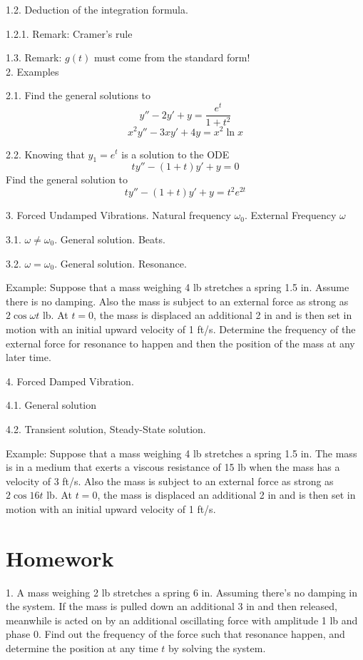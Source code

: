 \documentclass[11pt]{article}
\begin{document}
1.2. Deduction of the integration formula.

1.2.1. Remark: Cramer's rule

1.3. Remark: $g(t)$ must come from the standard form! \\

2. Examples

2.1. Find the general solutions to 
$$y'' - 2y' + y = \frac{e^t}{1+t^2}$$
$$x^2 y'' - 3x y' + 4y = x^2 \ln x$$

2.2. Knowing that $y_1 = e^t$ is a solution to the ODE
$$ty'' - (1+t)y' + y = 0$$
Find the general solution to
$$ty'' - (1+t)y' + y = t^2 e^{2t}$$
 

3. Forced Undamped Vibrations. Natural frequency $\omega_0$. External Frequency $\omega$

3.1. $\omega \neq \omega_0$. General solution. Beats. 

3.2. $\omega = \omega_0$. General solution. Resonance. 

Example: Suppose that a mass weighing 4 lb stretches a spring 1.5 in. Assume there is no damping. Also the mass is subject to an external force as strong as $2\cos \omega t$ lb. At $t=0$, the mass is displaced an additional 2 in and is then set in motion with an initial upward velocity of 1 ft/s. Determine the frequency of the external force for resonance to happen and then the position of the mass at any later time. 

4. Forced Damped Vibration.

4.1. General solution

4.2. Transient solution, Steady-State solution.

Example: Suppose that a mass weighing 4 lb stretches a spring 1.5 in. The mass is in a medium that exerts a viscous resistance of 15 lb when the mass has a velocity of 3 ft/s. Also the mass is subject to an external force as strong as $2\cos 16 t$ lb. At $t=0$, the mass is displaced an additional 2 in and is then set in motion with an initial upward velocity of 1 ft/s. 

\newpage
\section*{Homework}

1. A mass weighing 2 lb stretches a spring 6 in. Assuming there's no damping in the system. If the mass is pulled down an additional 3 in and then released, meanwhile is acted on by an additional oscillating force with amplitude 1 lb and phase 0. Find out the frequency of the force such that resonance happen, and determine the position at any time $t$ by solving the system. 
\end{document}
